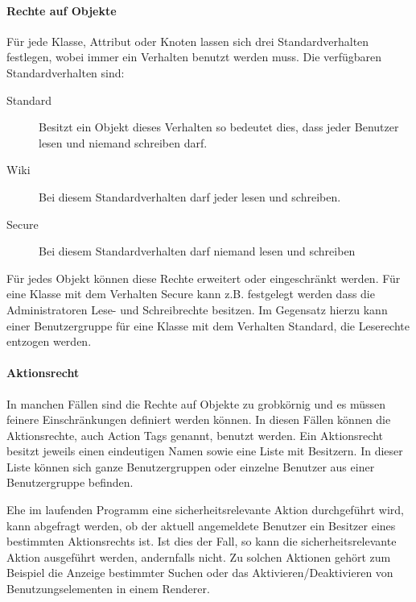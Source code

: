 \paragraph{Rechte auf Objekte}
Für jede Klasse, Attribut oder Knoten lassen sich drei Standardverhalten festlegen, wobei immer ein Verhalten benutzt werden muss. Die verfügbaren Standardverhalten sind:
\begin{description}
\item[Standard] Besitzt ein Objekt dieses Verhalten so bedeutet dies, dass jeder Benutzer lesen und niemand schreiben darf.
\item[Wiki] Bei diesem Standardverhalten darf jeder lesen und schreiben.
\item[Secure] Bei diesem Standardverhalten darf niemand lesen und schreiben
\end{description}
Für jedes Objekt können diese Rechte erweitert oder eingeschränkt werden. Für eine Klasse mit dem Verhalten Secure kann z.B. festgelegt werden dass die Administratoren Lese- und Schreibrechte besitzen.
Im Gegensatz hierzu kann einer Benutzergruppe für eine Klasse mit dem Verhalten Standard, die Leserechte entzogen werden. 

\paragraph{Aktionsrecht}
In manchen Fällen sind die Rechte auf Objekte zu grobkörnig und es müssen feinere Einschränkungen definiert werden können.
In diesen Fällen können die Aktionsrechte, auch Action Tags genannt, benutzt werden.
Ein Aktionsrecht besitzt jeweils einen eindeutigen Namen sowie eine Liste mit Besitzern.
In dieser Liste können sich ganze Benutzergruppen oder einzelne Benutzer aus einer Benutzergruppe befinden.

Ehe im laufenden Programm eine sicherheitsrelevante Aktion durchgeführt wird, kann abgefragt werden, ob der aktuell angemeldete Benutzer ein Besitzer eines bestimmten Aktionsrechts ist.
Ist dies der Fall, so kann die sicherheitsrelevante Aktion ausgeführt werden, andernfalls nicht.
Zu solchen Aktionen gehört zum Beispiel die Anzeige bestimmter Suchen oder das Aktivieren/Deaktivieren von Benutzungselementen in einem Renderer.




